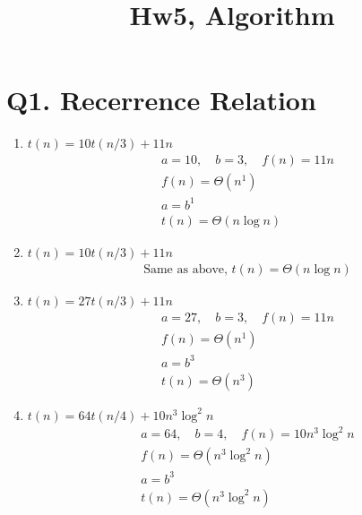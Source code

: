 \documentclass{article}
\begin{document}
\title{Hw5, Algorithm}
\author{}
\date{}
\maketitle

\section{Q1. Recerrence Relation}

\begin{enumerate}
    \item \( t(n) = 10t(n/3) + 11n \)
          \begin{align*}
               & a = 10, \quad b = 3, \quad f(n) = 11n \\
               & f(n) = \Theta(n^1)                    \\
               & a = b^1                               \\
               & t(n) = \Theta(n \log n)
          \end{align*}

    \item \( t(n) = 10t(n/3) + 11n \)
          \begin{align*}
               & \text{Same as above, } t(n) = \Theta(n \log n)
          \end{align*}

    \item \( t(n) = 27t(n/3) + 11n \)
          \begin{align*}
               & a = 27, \quad b = 3, \quad f(n) = 11n \\
               & f(n) = \Theta(n^1)                    \\
               & a = b^3                               \\
               & t(n) = \Theta(n^3)
          \end{align*}

    \item \( t(n) = 64t(n/4) + 10n^3 \log^2 n \)
          \begin{align*}
               & a = 64, \quad b = 4, \quad f(n) = 10n^3 \log^2 n \\
               & f(n) = \Theta(n^3 \log^2 n)                      \\
               & a = b^3                                          \\
               & t(n) = \Theta(n^3 \log^2 n)
          \end{align*}


\end{enumerate}
\end{document}
